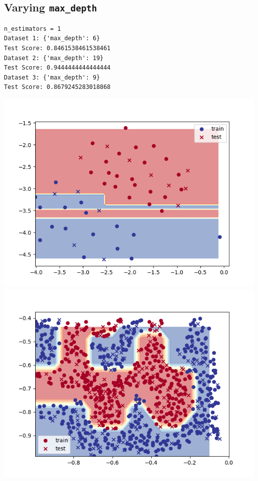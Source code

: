     \subsection{Varying \texttt{max\_depth}}
    \begin{verbatim}
n_estimators = 1
Dataset 1: {'max_depth': 6}
Test Score: 0.8461538461538461
Dataset 2: {'max_depth': 19}
Test Score: 0.9444444444444444
Dataset 3: {'max_depth': 9}
Test Score: 0.8679245283018868
    \end{verbatim}
    \includegraphics[width=\textwidth / 2]{plots/randomtree_nest1_1}
    \includegraphics[width=\textwidth / 2]{plots/randomtree_nest1_2}
